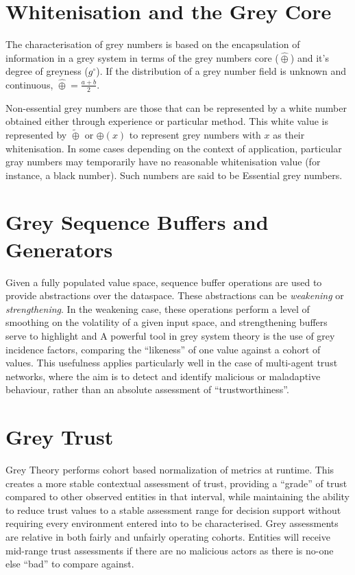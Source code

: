 \section{Whitenisation and the Grey Core}
The characterisation of grey numbers is based on the encapsulation of information in a grey system in terms of the grey numbers core ($\hat\oplus$) and it's degree of greyness ($g^\circ$).
If the distribution of a grey number field is unknown and continuous, $\hat\oplus = \frac{a + b}{2}$.

Non-essential grey numbers are those that can be represented by a white number obtained either through experience or particular method. \cite{Liu2011}
This white value is represented by $\tilde\oplus$ or $\oplus(x)$ to represent grey numbers with $x$ as their whitenisation.
In some cases depending on the context of application, particular gray numbers may temporarily have no reasonable whitenisation value (for instance, a black number).
Such numbers are said to be Essential grey numbers.

\section{Grey Sequence Buffers and Generators}
Given a fully populated value space, sequence buffer operations are used to provide abstractions over the dataspace.
These abstractions can be \emph{weakening} or \emph{strengthening}.
In the weakening case, these operations perform a level of smoothing on the volatility of a given input space, and strengthening buffers serve to highlight and 
A powerful tool in grey system theory is the use of grey incidence factors, comparing the ``likeness'' of one value against a cohort of values.
This usefulness applies particularly well in the case of multi-agent trust networks, where the aim is to detect and identify malicious or maladaptive behaviour, rather than an absolute assessment of ``trustworthiness''.

\section{Grey Trust}
Grey Theory performs cohort based normalization of metrics at runtime.
This creates a more stable contextual assessment of trust, providing a ``grade'' of trust compared to other observed entities in that interval, while maintaining the ability to reduce trust values to a stable assessment range for decision support without requiring every environment entered into to be characterised.
Grey assessments are relative in both fairly and unfairly operating cohorts.
Entities will receive mid-range trust assessments if there are no malicious actors as there is no-one else ``bad'' to compare against.

